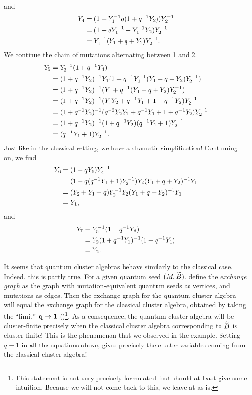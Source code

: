 and
\begin{align*}
	Y_4
	 & = (1 + Y_1 ^{-1} q (1 + q^{-1} Y_2))Y_2^{-1} \\
	 & = (1 + q Y_1^{-1} + Y_1^{-1} Y_2)Y_2^{-1}    \\
	 & = Y_1^{-1} (Y_1 + q + Y_2)Y_2^{-1}.
\end{align*}
%
We continue the chain of mutations alternating between 1 and 2.
\begin{align*}
	Y_5
	 & = Y_3^{-1} (1 + q^{-1} Y_4)                                                  \\
	 & = (1 + q^{-1} Y_2)^{-1} Y_1 (1 + q^{-1} Y_1^{-1}( Y_1 + q + Y_2)Y_2^{-1})       \\
	 & = (1 + q^{-1} Y_2)^{-1}  (Y_1 + q^{-1} ( Y_1 + q + Y_2)Y_2^{-1})               \\
	 & = (1 + q^{-1} Y_2)^{-1}  (Y_1 Y_2 + q^{-1} Y_1 + 1 + q^{-1} Y_2)Y_2^{-1}        \\
	 & = (1 + q^{-1} Y_2)^{-1}  (q^{-2} Y_2 Y_1 + q^{-1} Y_1 + 1 + q^{-1} Y_2)Y_2^{-1} \\
	 & = (1 + q^{-1} Y_2)^{-1}  (1 + q^{-1} Y_2)(q^{-1} Y_1 + 1)Y_2^{-1}               \\
	 & = (q^{-1} Y_1 + 1)Y_2^{-1}.
\end{align*}
%
Just like in the classical setting, we have a dramatic simplification! Continuing on,
we find
\begin{align*}
	Y_6
	 & = (1 + q Y_5)Y_4 ^{-1}                                      \\
	 & = (1 + q(q^{-1} Y_1 + 1)Y_2^{-1})Y_2 (Y_1 + q + Y_2)^{-1} Y_1 \\
	 & = (Y_2 +  Y_1 + q)Y_2^{-1} Y_2 (Y_1 + q + Y_2)^{-1} Y_1      \\
	 & = Y_1,
\end{align*}
%
and
\begin{align*}
	Y_7 & = Y_5^{-1} (1 + q^{-1} Y_6)                 \\
	    & = Y_2 (1 + q^{-1} Y_1)^{-1} (1 + q^{-1} Y_1) \\
	    & = Y_2.
\end{align*}
%

It seems that quantum cluster algebras behave similarly to the classical
case. Indeed, this is partly true. For a given quantum seed $(M, \widetilde{B})$, define the
\emph{exchange graph} as the graph with mutation-equivalent
quantum seeds as vertices, and mutations as edges. Then the exchange graph for the
quantum cluster algebra will equal the exchange graph for the classical cluster
algebra, obtained by taking the ``limit'' $\mathbf{q} \to \mathbf{1}$ (\cite[Theorem
	6.1]{BerensteinZelevinsky2005QCA})\footnote{This statement is not very precisely
	formulated, but should at least give some intuition. Because we will not come back to
	this, we leave at as is.}. As a consequence, the quantum cluster algebra will be
cluster-finite precisely when the classical cluster algebra corresponding to $\widetilde{B}$ is
cluster-finite! This is the phenomenon that we observed in the example. Setting $q = 1$
in all the equations above, gives precisely the cluster variables coming from the
classical cluster algebra!

